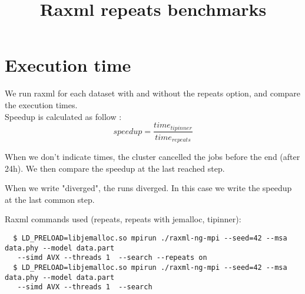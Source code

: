 \documentclass[a4paper]{article}
\begin{document}
\newcommand*{\figuretitle}[1]{%
    {\centering%
    \textbf{#1}%
    \par\medskip}%
}


\title{Raxml repeats benchmarks}
\maketitle


\section{Execution time}

\noindent We run raxml for each dataset with and without the repeats option, and compare the execution times.\\


\noindent Speedup is calculated as follow :  
$$ speedup = \frac{time_{tipinner}}{time_{repeats}}$$

When we don't indicate times, the cluster cancelled the jobs before the end (after 24h). We then compare the speedup at the last reached step. \newline

When we write "diverged", the runs diverged. In this case we write the speedup at the last common step.

Raxml commands used (repeats, repeats with jemalloc, tipinner):
\lstset{language=sh}
\begin{lstlisting}
  $ LD_PRELOAD=libjemalloc.so mpirun ./raxml-ng-mpi --seed=42 --msa data.phy --model data.part
   --simd AVX --threads 1  --search --repeats on
  $ LD_PRELOAD=libjemalloc.so mpirun ./raxml-ng-mpi --seed=42 --msa data.phy --model data.part
   --simd AVX --threads 1  --search 
\end{lstlisting}
\end{document}
